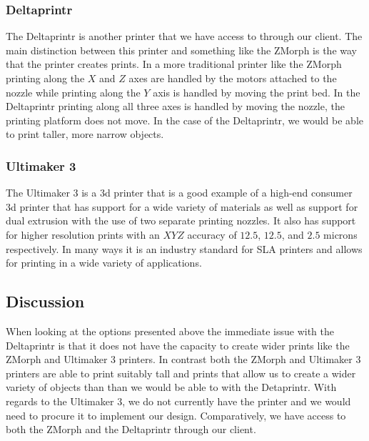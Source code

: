 \documentclass[letterpaper, onecolumn, draftclsnofoot, 10pt, compsoc]{IEEEtran}
\begin{document}
\subsubsection{Deltaprintr}
	\begin{singlespacing}
	The Deltaprintr is another printer that we have access to through our client. The main distinction between this printer and something like the ZMorph is the way that the printer creates prints. In a more traditional printer like the ZMorph printing along the $X$ and $Z$ axes are handled by the motors attached to the nozzle while printing along the $Y$ axis is handled by moving the print bed. In the Deltaprintr printing along all three axes is handled by moving the nozzle, the printing platform does not move. In the case of the Deltaprintr, we would be able to print taller, more narrow objects.\cite{deltago}
    \end{singlespacing}
\subsubsection{Ultimaker 3}
	\begin{singlespacing}
	The Ultimaker 3 is a 3d printer that is a good example of a high-end consumer 3d printer that has support for a wide variety of materials as well as support for dual extrusion with the use of two separate printing nozzles. It also has support for higher resolution prints with an $XYZ$ accuracy of $12.5$, $12.5$, and $2.5$ microns respectively. In many ways it is an industry standard for SLA printers and allows for printing in a wide variety of applications.\cite{ultimaker3}
    \end{singlespacing}
\subsection{Discussion}
	\begin{singlespacing}
	When looking at the options presented above the immediate issue with the Deltaprintr is that it does not have the capacity to create wider prints like the ZMorph and Ultimaker 3 printers. In contrast both the ZMorph and Ultimaker 3 printers are able to print suitably tall and prints that allow us to create a wider variety of objects than than we would be able to with the Detaprintr. With regards to the Ultimaker 3, we do not currently have the printer and we would need to procure it to implement our design. Comparatively, we have access to both the ZMorph and the Deltaprintr through our client. 
	\end{singlespacing}
\end{document}

